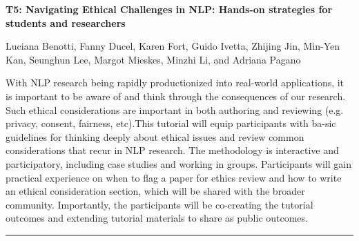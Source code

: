 \begin{center}
    \Large{\textbf{T5: Navigating Ethical Challenges in NLP: Hands-on strategies for students and researchers}\\}
    \par\bigskip
    \large{Luciana Benotti, Fanny Ducel, Karen Fort, Guido Ivetta, Zhijing Jin, Min-Yen Kan,
Seunghun Lee, Margot Mieskes, Minzhi Li, and Adriana Pagano}\\
    \par\bigskip

\end{center}

With NLP research being rapidly productionized into real-world applications, it is important to be aware of and think through the consequences of our research. Such ethical considerations are important in both authoring and reviewing (e.g. privacy, consent, fairness, etc).This tutorial will equip participants with ba-sic guidelines for thinking deeply about ethical issues and review common considerations that recur in NLP research. The methodology is interactive and participatory, including case studies and working in groups. Participants will gain practical experience on when to flag a paper for ethics review and how to write an ethical consideration section, which will be shared with the broader community. Importantly, the participants will be co-creating the tutorial outcomes and extending tutorial materials to share as public outcomes.

\begin{center}
    \noindent\rule{200px}{1pt}
\end{center}
